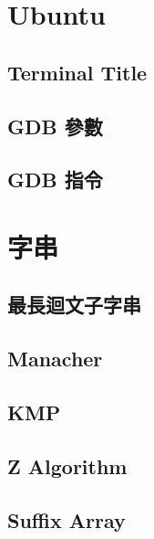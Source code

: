 
\section{Ubuntu}
%         
%         
    \subsection{Terminal Title}
        
    \subsection{GDB 參數}
        
    \subsection{GDB 指令}
        
\clearpage

\section{字串}
    \subsection{最長迴文子字串}
         
    \subsection{Manacher}
         \columnbreak
    \subsection{KMP}
        
    \subsection{Z Algorithm}
          \columnbreak
    \subsection{Suffix Array}
        
\clearpage

